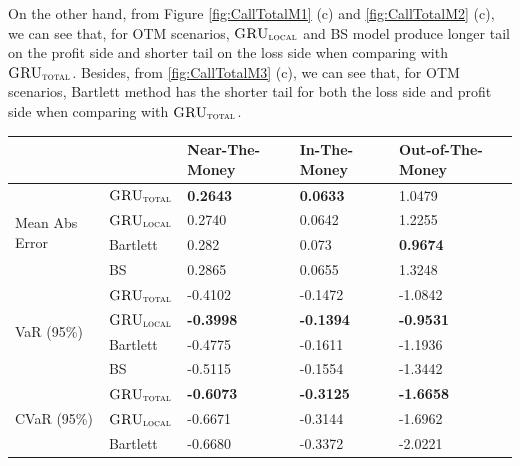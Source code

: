 \documentclass[letterpaper,12pt,titlepage,oneside,final]{book}
\numberwithin{equation}{section}
\theoremstyle{definition}
\newcommand{\modelT}{\textsc{GRU}_{\textsc{total}}}
\newcommand{\modelL}{\textsc{GRU}_{\textsc{local}}}
\begin{document}
On the other hand, from Figure \ref{fig:CallTotalM1} (c) and \ref{fig:CallTotalM2} (c), we can see that, for OTM scenarios, $\modelL$ and BS model produce longer tail on the profit side and  shorter tail on the loss side when comparing with $\modelT$. Besides, from \ref{fig:CallTotalM3} (c), we can see that, for OTM scenarios, Bartlett method has the shorter tail for both the loss side and profit side when comparing with $\modelT$. 
\begin{table}[htp!]
	\centering
	\begin{tabular}{ll|l|l|l|}
		\cline{3-5}
		&          & Near-The-Money   & In-The-Money     & Out-of-The-Money \\ \hline
		\multicolumn{1}{|l|}{\multirow{4}{*}{Mean Abs Error}} & $\modelT$    & \textbf{0.2643}  & \textbf{0.0633}  & 1.0479           \\  
		\multicolumn{1}{|l|}{}                                & $\modelL$    & 0.2740           & 0.0642           & 1.2255           \\  
		\multicolumn{1}{|l|}{}                                & Bartlett & 0.282            & 0.073            & \textbf{0.9674}  \\  
		\multicolumn{1}{|l|}{}                                & BS       & 0.2865           & 0.0655           & 1.3248           \\ \hline
		\multicolumn{1}{|l|}{\multirow{4}{*}{VaR (95\%)}}     & $\modelT$    & -0.4102          & -0.1472          & -1.0842          \\  
		\multicolumn{1}{|l|}{}                                & $\modelL$    & \textbf{-0.3998} & \textbf{-0.1394} & \textbf{-0.9531} \\  
		\multicolumn{1}{|l|}{}                                & Bartlett & -0.4775          & -0.1611          & -1.1936          \\  
		\multicolumn{1}{|l|}{}                                & BS       & -0.5115          & -0.1554          & -1.3442          \\ \hline
		\multicolumn{1}{|l|}{\multirow{4}{*}{CVaR (95\%)}}    & $\modelT$    & \textbf{-0.6073} & \textbf{-0.3125} & \textbf{-1.6658} \\  
		\multicolumn{1}{|l|}{}                                & $\modelL$    & -0.6671          & -0.3144          & -1.6962          \\  
		\multicolumn{1}{|l|}{}                                & Bartlett & -0.6680          & -0.3372          & -2.0221          \\  

\end{tabular}
\end{table}
\end{document}
